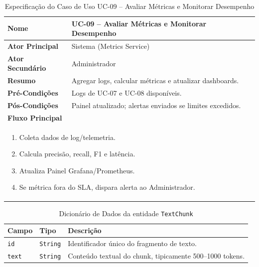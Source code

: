 \begin{table}[H]
\centering
\caption{Especificação do Caso de Uso UC-09 – Avaliar Métricas e Monitorar Desempenho}
\label{tab:uc09}
\begin{tabular}{|p{4cm}|p{11cm}|}
\hline
\textbf{Nome}        & UC-09 – Avaliar Métricas e Monitorar Desempenho \\ \hline
\textbf{Ator Principal} & Sistema (Metrics Service) \\ \hline
\textbf{Ator Secundário} & Administrador \\ \hline
\textbf{Resumo}      & Agregar logs, calcular métricas e atualizar dashboards. \\ \hline
\textbf{Pré-Condições} & Logs de UC-07 e UC-08 disponíveis. \\ \hline
\textbf{Pós-Condições} & Painel atualizado; alertas enviados se limites excedidos. \\ \hline
\multicolumn{2}{|l|}{\textbf{Fluxo Principal}} \\ \hline
\multicolumn{2}{|p{15cm}|}{%
\begin{enumerate}[leftmargin=*]
  \item Coleta dados de log/telemetria.
  \item Calcula precisão, recall, F1 e latência.
  \item Atualiza Painel Grafana/Prometheus.
  \item Se métrica fora do SLA, dispara alerta ao Administrador.
\end{enumerate}} \\ \hline
\end{tabular}
\end{table}

\begin{table}[H]
  \centering
  \caption{Dicionário de Dados da entidade \texttt{TextChunk}}
  \label{tab:dd_textchunk}
  \begin{tabular}{|p{3cm}|p{4cm}|p{8cm}|}
    \hline
    \textbf{Campo} & \textbf{Tipo} & \textbf{Descrição} \\ \hline
    \texttt{id}    & \texttt{String} & Identificador único do fragmento de texto. \\ \hline
    \texttt{text}  & \texttt{String} & Conteúdo textual do chunk, tipicamente 500–1000 tokens. \\ \hline
  \end{tabular}
\end{table}

